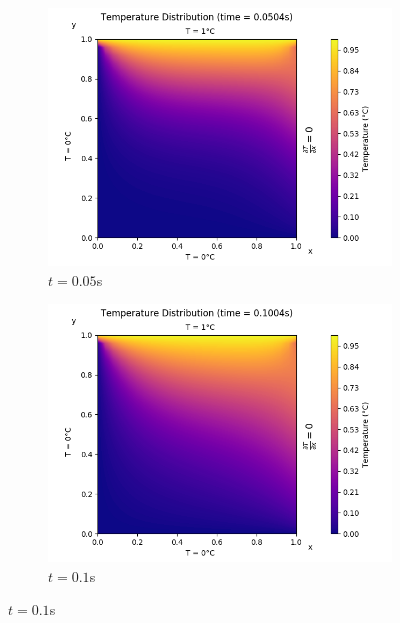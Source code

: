 \documentclass[a4paper]{article}
\begin{document}
\begin{figure}[H]
		\medskip
		\begin{subfigure}{0.48\textwidth}
			\includegraphics[width=\linewidth]{figures/2/3)t=50ms.png}
			\caption{$t = 0.05$s}
		\end{subfigure}\hspace*{\fill}
		\begin{subfigure}{0.48\textwidth}
			\includegraphics[width=\linewidth]{figures/2/4)t=100ms.png}
			\caption{$t = 0.1$s}
		\end{subfigure}
		

\end{figure}
\end{document}
